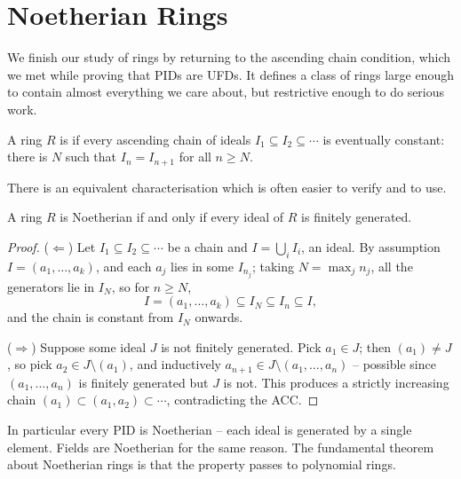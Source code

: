 \documentclass[a4paper]{scrartcl}
\begin{document}
\section{Noetherian Rings}

We finish our study of rings by returning to the ascending chain condition, which we met while proving that PIDs are UFDs. It defines a class of rings large enough to contain almost everything we care about, but restrictive enough to do serious work.

\begin{definition}
	A ring $R$ is  if every ascending chain of ideals $I_1 \subseteq I_2 \subseteq \cdots$ is eventually constant: there is $N$ such that $I_n = I_{n + 1}$ for all $n \geq N$.
\end{definition}

There is an equivalent characterisation which is often easier to verify and to use.

\begin{lemma}
	A ring $R$ is Noetherian if and only if every ideal of $R$ is finitely generated.
\end{lemma}
\begin{proof}
	($\Leftarrow$) Let $I_1 \subseteq I_2 \subseteq \cdots$ be a chain and $I = \bigcup_i I_i$, an ideal. By assumption $I = (a_1, \dots, a_k)$, and each $a_j$ lies in some $I_{n_j}$; taking $N = \max_j n_j$, all the generators lie in $I_N$, so for $n \geq N$,
	$$
	I = (a_1, \dots, a_k) \subseteq I_N \subseteq I_n \subseteq I,
	$$
	and the chain is constant from $I_N$ onwards.

	($\Rightarrow$) Suppose some ideal $J$ is not finitely generated. Pick $a_1 \in J$; then $(a_1) \neq J$, so pick $a_2 \in J \setminus (a_1)$, and inductively $a_{n+1} \in J \setminus (a_1, \dots, a_n)$ -- possible since $(a_1, \dots, a_n)$ is finitely generated but $J$ is not. This produces a strictly increasing chain $(a_1) \subset (a_1, a_2) \subset \cdots$, contradicting the ACC.
\end{proof}

In particular every PID is Noetherian -- each ideal is generated by a single element. Fields are Noetherian for the same reason. The fundamental theorem about Noetherian rings is that the property passes to polynomial rings.
\end{document}

